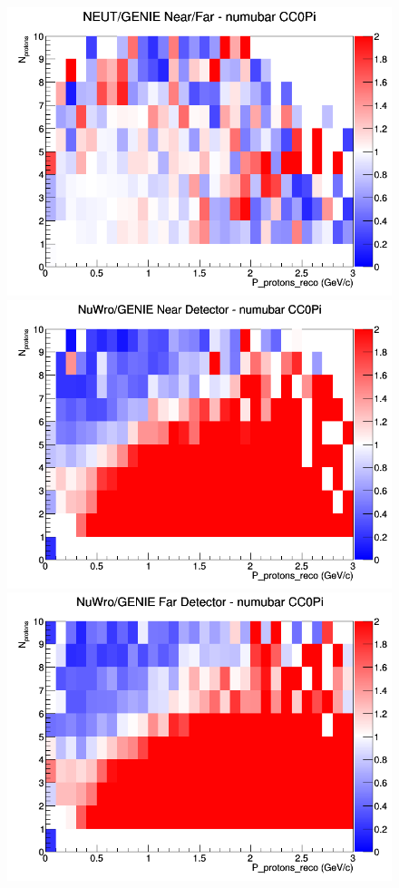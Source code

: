 \documentclass[12pt]{article}
\begin{document}
\begin{figure}[h]
\endminipage
{}
\includegraphics[width=\linewidth]{eff_N_P/LAr/protons/ratios/CC0Pi_NEUT_GENIE_numubar_NF_N_P.png}
\endminipage
\newline
{}
\includegraphics[width=\linewidth]{eff_N_P/LAr/protons/ratios/CC0Pi_NuWro_GENIE_numubar_near_N_P.png}
\endminipage
{}
\includegraphics[width=\linewidth]{eff_N_P/LAr/protons/ratios/CC0Pi_NuWro_GENIE_numubar_far_N_P.png}

\end{figure}
\end{document}
